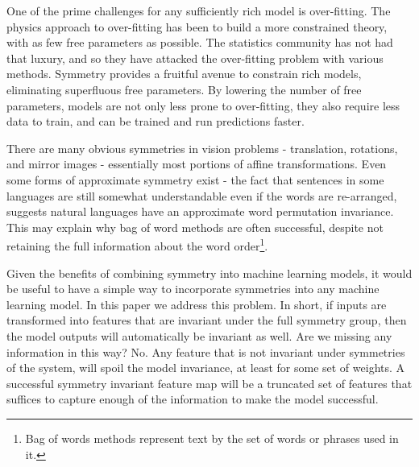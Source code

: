 \documentclass[twocolumn, nofootinbib, aps, prb]{revtex4-1}
\begin{document}

One of the prime challenges for any sufficiently rich model is over-fitting. The physics approach to over-fitting has been to build a more constrained theory, with as few free parameters as possible. The statistics community has not had that luxury, and so they have attacked the over-fitting problem with various methods. Symmetry provides a fruitful avenue to constrain rich models, eliminating superfluous free parameters. By lowering the number of free parameters, models are not only less prone to over-fitting, they also require less data to train, and can be trained and run predictions faster.


There are many obvious symmetries in vision problems - translation, rotations, and mirror images - essentially most portions of affine transformations\cite{gens2014deep, dieleman2016exploiting, cohen2016group, henriques2016warped}. Even some forms of approximate symmetry exist\cite{kiddonsymmetry} - the fact that sentences in some languages are still somewhat understandable even if the words are re-arranged, suggests natural languages have an approximate word permutation invariance. This may explain why bag of word methods are often successful, despite not retaining the full information about the word order\footnote{Bag of words methods represent text by the set of words or phrases used in it.}. 

Given the benefits of combining symmetry into machine learning models, it would be useful to have a simple way to incorporate symmetries into any machine learning model. In this paper we address this problem. In short, if inputs are transformed into features that are invariant under the full symmetry group, then the model outputs will automatically be invariant as well. Are we missing any information in this way? No. Any feature that is not invariant under symmetries of the system, will spoil the model invariance, at least for some set of weights. A successful symmetry invariant feature map will be a truncated set of features that suffices to capture enough of the information to make the model successful.
\end{document}
